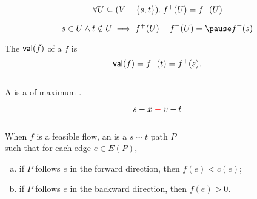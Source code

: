 \begin{frame}{}

  \pause
  \[
    \forall U \subseteq (V - \{s, t\}).\; f^{+}(U) = f^{-}(U)
  \]

  \pause
  \[
    s \in U \land t \notin U \implies f^{+}(U) - f^{-}(U) = \pause f^{+}(s)
  \]
\end{frame}

\begin{frame}{}
  \begin{definition}[Value (值)]
    The  $\textsf{val}(f)$ of a  $f$ is
    \[
      \textsf{val}(f) = f^{-}(t) = f^{+}(s).
    \]
  \end{definition}

  \vspace{0.30cm}
  \begin{columns}
      \pause
  \end{columns}

  \pause
  \vspace{0.50cm}
  \begin{definition}
    A  is a  of maximum .
  \end{definition}
\end{frame}

\begin{frame}{}
  \[
    s - x \;\textcolor{red}{-}\; v - t
  \]
  \vspace{-0.30cm}
  \begin{columns}
  \end{columns}

  \pause
  \vspace{0.30cm}
  \begin{definition}
    When $f$ is a feasible flow, an  is a $s \sim t$ path $P$ \\
     such that for each edge $e \in E(P)$,
    \begin{enumerate}[(a)]
      \item if $P$ follows $e$ in the forward direction, then $f(e) < c(e)$;
      \item if $P$ follows $e$ in the backward direction, then $f(e) > 0$.
    \end{enumerate}
  \end{definition}
\end{frame}

